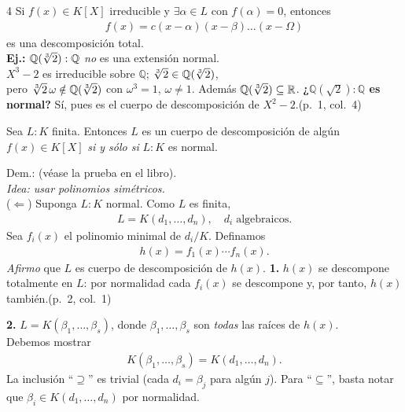 \documentclass[landscape,a4paper]{article}
\begin{document}
\begin{multicols}{4}
Si $f(x)\in K[X]$ irreducible y $\exists\alpha\in L$ con $f(\alpha)=0$, entonces
\begin{align*}
f(x)=c(x-\alpha)(x-\beta)\dots(x-\Omega)
\end{align*}
es una descomposición total.\\[0.4em]
\textbf{Ej.:}\;
$\mathbb{Q}(\root 3 \of 2):\mathbb{Q}$ \emph{no} es una extensión normal.\\
$X^{3}-2$ es irreducible sobre $\mathbb{Q}$; $\root 3 \of 2\in\mathbb{Q}(\root 3 \of 2)$,\\
pero $\root 3 \of 2\,\omega\notin\mathbb{Q}(\root 3 \of 2)$ con $\omega^{3}=1$, $\omega\neq1$.
Además $\mathbb{Q}(\root 3 \of 2)\subseteq\mathbb{R}$.
\noindent\textbf{¿$\mathbb{Q}(\sqrt{2}):\mathbb{Q}$ es normal?} \;Sí, pues es el cuerpo de descomposición de $X^{2}-2$.\hfill(p.~1, col.~4)
\begin{tcolorbox}[title={Proposición: Normal + finita = descomposición},
                 colback=white,colframe=brown!80!black,
                 colbacktitle=brown!80!black,coltitle=white]
Sea $L:K$ finita. Entonces $L$ es un cuerpo de descomposición de algún $f(x)\in K[X]$
\emph{si y sólo si} $L:K$ es normal.
\end{tcolorbox}

Dem.: (véase la prueba en el libro).\\
\emph{Idea: usar polinomios simétricos.}\\[2pt]
($\Leftarrow$)\; Suponga $L:K$ normal. Como $L$ es finita,
\begin{align*}
L=K(d_{1},\dots,d_{n}),\quad d_{i}\;\text{algebraicos}.
\end{align*}
Sea $f_{i}(x)$ el polinomio minimal de $d_{i}/K$.  Definamos
\begin{align*}
h(x)=f_{1}(x)\cdots f_{n}(x).
\end{align*}
\emph{Afirmo} que $L$ es cuerpo de descomposición de $h(x)$.
\noindent\textbf{1.}\; $h(x)$ se descompone totalmente en $L$: por normalidad cada $f_{i}(x)$ se descompone y, por tanto, $h(x)$ también.\hfill(p.~2, col.~1)

\noindent\textbf{2.}\; $L=K(\beta_{1},\dots,\beta_{s})$, donde $\beta_{1},\dots,\beta_{s}$ son \emph{todas} las raíces de $h(x)$.\\
Debemos mostrar
\begin{align*}
K(\beta_{1},\dots,\beta_{s})=K(d_{1},\dots,d_{n}).
\end{align*}
La inclusión “$\supseteq$” es trivial (cada $d_{i}=\beta_{j}$ para algún $j$).  
Para “$\subseteq$”, basta notar que $\beta_{i}\in K(d_{1},\dots,d_{n})$ por normalidad.\\[-0.3em]


\end{multicols}
\end{document}
